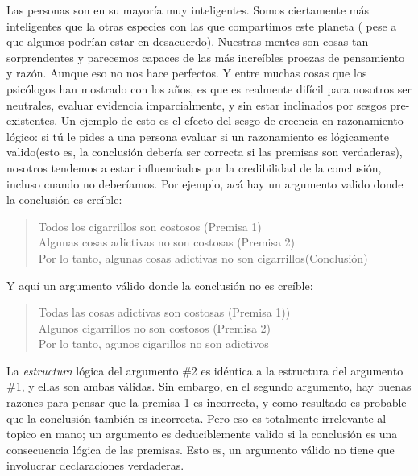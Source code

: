 
Las personas son en su mayoría muy inteligentes. Somos ciertamente más inteligentes que la otras especies con las que compartimos este planeta ( pese a que algunos podrían estar en desacuerdo). Nuestras mentes son cosas tan sorprendentes y parecemos capaces de las más increíbles proezas de pensamiento y razón. Aunque eso no nos hace perfectos. Y entre muchas cosas que los psicólogos han mostrado con los años, es que es realmente difícil para nosotros ser neutrales, evaluar evidencia imparcialmente, y sin estar inclinados por sesgos pre-existentes. Un ejemplo de esto es el efecto del sesgo de creencia en razonamiento lógico: si tú le pides a una persona evaluar si un razonamiento es lógicamente valido(esto es, la conclusión debería ser correcta si las premisas son verdaderas), nosotros tendemos a estar influenciados por la credibilidad de la conclusión, incluso cuando no deberíamos. Por ejemplo, acá hay un argumento valido donde la conclusión es creíble: 
\begin{quote}
Todos los cigarrillos son costosos (Premisa 1) \\
Algunas cosas adictivas no son costosas (Premisa 2)\\
Por lo tanto, algunas cosas adictivas no son cigarrillos(Conclusión)
\end{quote}
Y aquí un argumento válido donde la conclusión no es creíble:
\begin{quote}
Todas las cosas adictivas son costosas  (Premisa 1))\\
Algunos cigarrillos no son costosos (Premisa 2)\\
Por lo tanto, agunos cigarillos no son adictivos
\end{quote}
La   {\it estructura} lógica del argumento \#2 es idéntica a la estructura del argumento \#1, y ellas son ambas válidas. Sin embargo, en el segundo argumento, hay buenas razones para pensar que la premisa 1 es incorrecta, y como resultado es probable que la conclusión también es incorrecta.  Pero eso es totalmente irrelevante al topico en mano; un argumento es deduciblemente valido si la conclusión es una consecuencia lógica de las premisas. Esto es, un argumento válido no tiene que involucrar declaraciones verdaderas.


